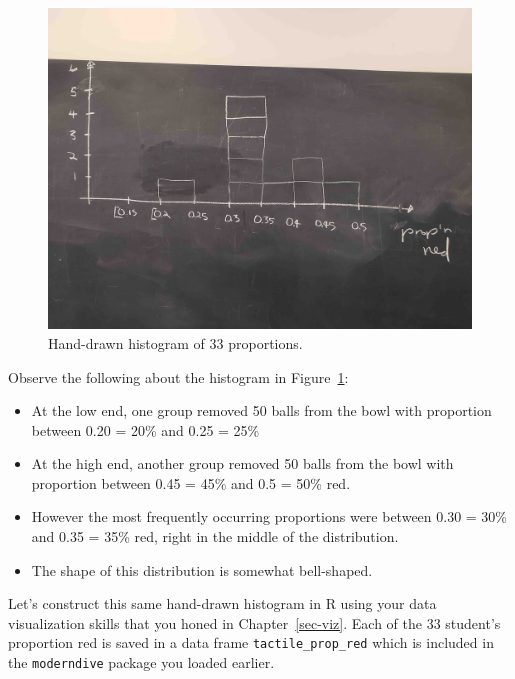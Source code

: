 \documentclass[
  letterpaper,
  DIV=11,
  numbers=noendperiod]{scrreprt}
\providecommand{\tightlist}{%
  \setlength{\itemsep}{0pt}\setlength{\parskip}{0pt}}\usepackage{longtable,booktabs,array}
\theoremstyle{definition}
\theoremstyle{remark}
\begin{document}
\begin{figure}

{\centering \includegraphics{images/sampling/tactile_3_c.jpg}

}

\caption{\label{fig-sampling-exercise-5}Hand-drawn histogram of 33
proportions.}

\end{figure}

Observe the following about the histogram in
Figure~\ref{fig-sampling-exercise-5}:

\begin{itemize}
\tightlist
\item
  At the low end, one group removed 50 balls from the bowl with
  proportion between 0.20 = 20\% and 0.25 = 25\%
\item
  At the high end, another group removed 50 balls from the bowl with
  proportion between 0.45 = 45\% and 0.5 = 50\% red.
\item
  However the most frequently occurring proportions were between 0.30 =
  30\% and 0.35 = 35\% red, right in the middle of the distribution.
\item
  The shape of this distribution is somewhat bell-shaped.
\end{itemize}

Let's construct this same hand-drawn histogram in R using your data
visualization skills that you honed in Chapter~\ref{sec-viz}. Each of
the 33 student's proportion red is saved in a data frame
\texttt{tactile\_prop\_red} which is included in the \texttt{moderndive}
package you loaded earlier.
\end{document}
